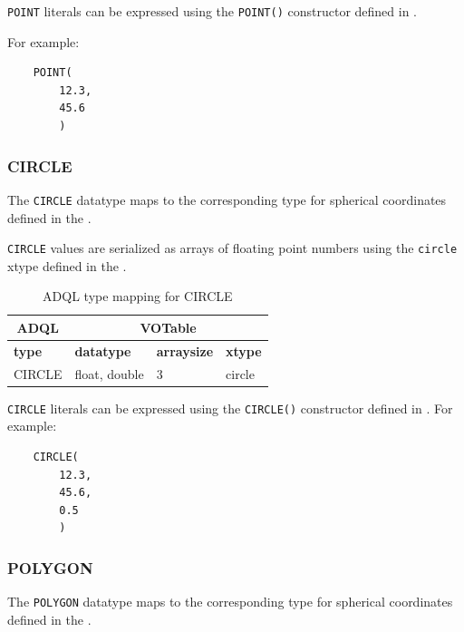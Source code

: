 \documentclass[11pt,a4paper]{ivoa}
\begin{document}
\verb:POINT: literals can be expressed using the \verb:POINT():
constructor defined in .

For example:
\begin{verbatim}
    POINT(
        12.3,
        45.6
        )
\end{verbatim}

\subsubsection{CIRCLE}
\label{sec:types.geom.circle}

The \verb:CIRCLE: datatype maps to the corresponding type
for spherical coordinates defined in the
\DALISpec{}.

\verb:CIRCLE: values are serialized as arrays of floating point numbers
using the \verb:circle: xtype defined in the \DALISpec{}.

\begin{table}[th]\footnotesize
    \begin{tabular}
        {|p{}|p{}|p{}|p{}|}
        
        \hline
        \multicolumn{1}{|c|}{\textbf{ADQL}} &
        \multicolumn{3}{|c|}{\textbf{VOTable}}
        \tabularnewline
        
        \hline
        \textbf{type} &
        \textbf{datatype} &
        \textbf{arraysize} &
        \textbf{xtype}
        \tabularnewline

        \hline
        CIRCLE &
        float, double &
        3 &
        circle
        \tabularnewline
        \hline
    \end{tabular}
    \caption{ADQL type mapping for CIRCLE}
    \label{table:types.geom.circle}
\end{table}

\verb:CIRCLE: literals can be expressed using the \verb:CIRCLE():
constructor defined in .
For example:
\begin{verbatim}
    CIRCLE(
        12.3,
        45.6,
        0.5
        )
\end{verbatim}

\subsubsection{POLYGON}
\label{sec:types.geom.polygon}

The \verb:POLYGON: datatype maps to the corresponding type
for spherical coordinates defined in the
\DALISpec{}.
\end{document}
